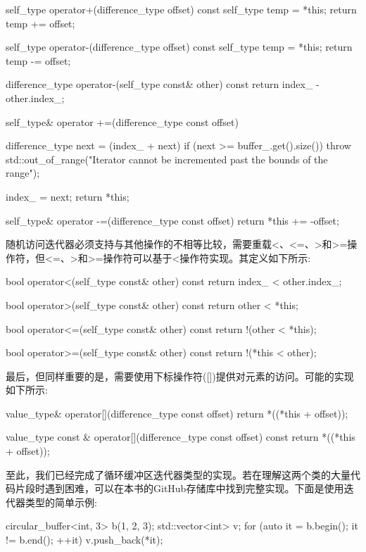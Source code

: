\begin{cpp}
self_type operator+(difference_type offset) const
{
	self_type temp = *this;
	return temp += offset;
}

self_type operator-(difference_type offset) const
{
	self_type temp = *this;
	return temp -= offset;
}

difference_type operator-(self_type const& other) const
{
	return index_ - other.index_;
}

self_type& operator +=(difference_type const offset)
{
	difference_type next =
		(index_ + next) %
	if (next >= buffer_.get().size())
		throw std::out_of_range("Iterator cannot be
								 incremented past the bounds of the range");
								 
	index_ = next;
	return *this;
}

self_type& operator -=(difference_type const offset)
{
	return *this += -offset;
}
\end{cpp}

随机访问迭代器必须支持与其他操作的不相等比较，需要重载<、<=、>和>=操作符，但<=、>和>=操作符可以基于<操作符实现。其定义如下所示:

\begin{cpp}
bool operator<(self_type const& other) const
{
	return index_ < other.index_;
}

bool operator>(self_type const& other) const
{
	return other < *this;
}

bool operator<=(self_type const& other) const
{
	return !(other < *this);
}

bool operator>=(self_type const& other) const
{
	return !(*this < other);
}
\end{cpp}

最后，但同样重要的是，需要使用下标操作符([])提供对元素的访问。可能的实现如下所示:

\begin{cpp}
value_type& operator[](difference_type const offset)
{
	return *((*this + offset));
}

value_type const & operator[](difference_type const offset)
const
{
	return *((*this + offset));
}
\end{cpp}

至此，我们已经完成了循环缓冲区迭代器类型的实现。若在理解这两个类的大量代码片段时遇到困难，可以在本书的GitHub存储库中找到完整实现。下面是使用迭代器类型的简单示例:

\begin{cpp}
circular_buffer<int, 3> b({1, 2, 3});
std::vector<int> v;
for (auto it = b.begin(); it != b.end(); ++it)
{
	v.push_back(*it);
}
\end{cpp}

